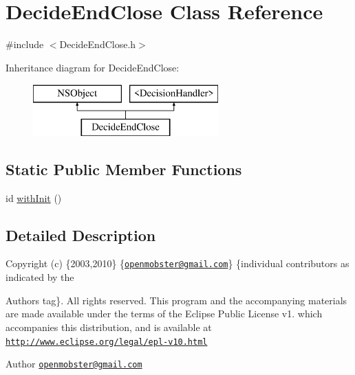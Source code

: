 \hypertarget{interface_decide_end_close}{
\section{\-Decide\-End\-Close \-Class \-Reference}
\label{interface_decide_end_close}
}


{\ttfamily \#include $<$\-Decide\-End\-Close.\-h$>$}

\-Inheritance diagram for \-Decide\-End\-Close\-:\begin{figure}[H]
\begin{center}
\leavevmode
\includegraphics[height=2.000000cm]{interface_decide_end_close}
\end{center}
\end{figure}
\subsection*{\-Static \-Public \-Member \-Functions}
\begin{DoxyCompactItemize}
\item 
id \hyperlink{interface_decide_end_close_acbba1d037731845b1b1b919f043f2aca}{with\-Init} ()
\end{DoxyCompactItemize}


\subsection{\-Detailed \-Description}
\-Copyright (c) \{2003,2010\} \{\href{mailto:openmobster@gmail.com}{\tt openmobster@gmail.\-com}\} \{individual contributors as indicated by the \begin{DoxyAuthor}{\-Authors}
tag\}. \-All rights reserved. \-This program and the accompanying materials are made available under the terms of the \-Eclipse \-Public \-License v1. which accompanies this distribution, and is available at \href{http://www.eclipse.org/legal/epl-v10.html}{\tt http\-://www.\-eclipse.\-org/legal/epl-\/v10.\-html}
\end{DoxyAuthor}
\begin{DoxyAuthor}{\-Author}
\href{mailto:openmobster@gmail.com}{\tt openmobster@gmail.\-com} 
\end{DoxyAuthor}


